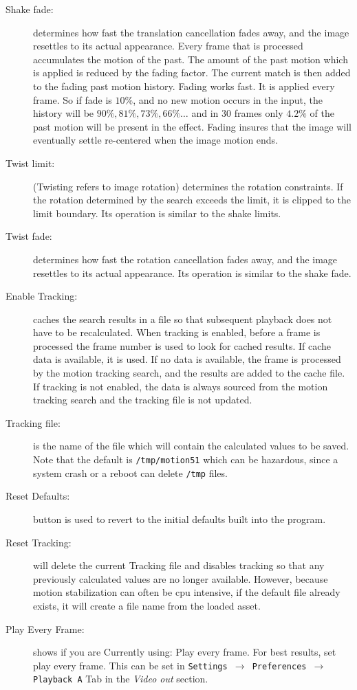 \begin{description}
    \item[Shake fade:] determines how fast the translation cancellation fades away, and the image resettles to its actual appearance. Every frame that is processed accumulates the motion of the past. The amount of the past motion which is applied is reduced by the fading factor. The current match is then added to the fading past motion history. Fading works fast. It is applied every frame. So if fade is $10\%$, and no new motion occurs in the input, the history will be $90\%, 81\%, 73\%, 66\%\dots$ and in $30$ frames only $4.2\%$ of the past motion will be present in the effect. Fading insures that the image will eventually settle re-centered when the image motion ends.
    \item[Twist limit:] (Twisting refers to image rotation) determines the rotation constraints. If the rotation determined by the search exceeds the limit, it is clipped to the limit boundary. Its operation is similar to the shake limits.
    \item[Twist fade:] determines how fast the rotation cancellation fades away, and the image resettles to its actual appearance. Its operation is similar to the shake fade.
    \item[Enable Tracking:] caches the search results in a file so that subsequent playback does not have to be recalculated. When tracking is enabled, before a frame is processed the frame number is used to look for cached results. If cache data is available, it is used. If no data is available, the frame is processed by the motion tracking search, and the results are added to the cache file. If tracking is not enabled, the data is always sourced from the motion tracking search and the tracking file is not updated.
    \item[Tracking file:] is the name of the file which will contain the calculated values to be saved. Note that the default is \texttt{/tmp/motion51} which can be hazardous, since a system crash or a reboot can delete \texttt{/tmp} files.
    \item[Reset Defaults:] button is used to revert to the initial defaults built into the program.
    \item[Reset Tracking:] will delete the current Tracking file and disables tracking so that any previously calculated values are no longer available. However, because motion stabilization can often be cpu intensive, if the default file already exists, it will create a file name from the loaded asset.
    \item[Play Every Frame:] shows if you are Currently using: Play every frame. For best results, set play every frame. This can be set in \texttt{Settings $\rightarrow$ Preferences $\rightarrow$ Playback A} Tab in the \textit{Video out} section.
\end{description}

